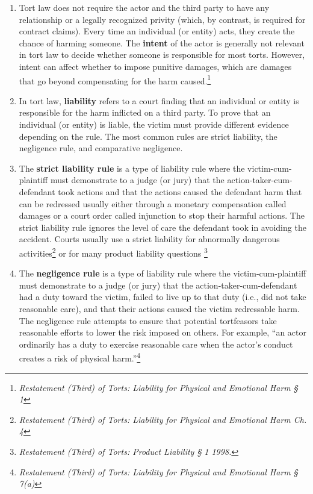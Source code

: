 \documentclass[11pt]{article}
\begin{document}
\begin{enumerate}[wide, labelindent=0pt, itemsep=0pt, topsep=1pt]
    \item[\textbullet] Tort law does not require the actor and the third party to have any relationship or a legally recognized privity (which, by contrast, is required for contract claims).  Every time an individual (or entity) acts, they create the chance of harming someone.  The \textbf{intent} of the actor is generally not relevant in tort law to decide whether someone is responsible for most torts. However, intent can affect whether to impose punitive damages, which are damages that go beyond compensating for the harm caused.\footnote{\textit{Restatement (Third) of Torts: Liability for Physical and Emotional Harm § 1}} 
    \item[\textbullet] In tort law, \textbf{liability} refers to a court finding that an individual or entity is responsible for the harm inflicted on a third party.  To prove that an individual (or entity) is liable, the victim must provide different evidence depending on the rule.  The most common rules are strict liability, the negligence rule, and comparative negligence.
    \item[\textbullet] The \textbf{strict liability rule} is a type of liability rule where the victim-cum-plaintiff must demonstrate to a judge (or jury) that the action-taker-cum-defendant took actions and that the actions caused the defendant harm that can be redressed usually either through a monetary compensation called damages or a court order called injunction to stop their harmful actions.  The strict liability rule ignores the level of care the defendant took in avoiding the accident.  Courts usually use a strict liability for abnormally dangerous activities\footnote{\textit{Restatement (Third) of Torts: Liability for Physical and Emotional Harm Ch. 4}} or for many product liability questions \footnote{\textit{Restatement (Third) of Torts: Product Liability § 1 1998.}} 
    \item[\textbullet] The \textbf{negligence rule} is a type of liability rule where the victim-cum-plaintiff must demonstrate to a judge (or jury) that the action-taker-cum-defendant had a duty toward the victim, failed to live up to that duty (i.e., did not take reasonable care), and that their actions caused the victim redressable harm.  The negligence rule attempts to ensure that potential tortfeasors take reasonable efforts to lower the risk imposed on others. For example, ``an actor ordinarily has a duty to exercise reasonable care when the actor's conduct creates a risk of physical harm.''\footnote{\textit{Restatement (Third) of Torts: Liability for Physical and Emotional Harm § 7(a)}}

\end{enumerate}
\end{document}
